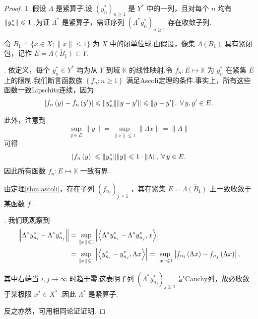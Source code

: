 \begin{proof}
1. 假设 $\Lambda$ 是紧算子.设 ${\left( {y}_{n}^{ * }\right) }_{n \geq  1}$ 是 ${Y}^{ * }$ 中的一列，且对每个 $n$ 均有 $\norm{{y}_{n}^{ * }} \leqslant  1$ .为证 ${\Lambda }^{ * }$ 是紧算子，需证序列 ${\left( {\Lambda }^{ * }{y}_{n}^{ * }\right) }_{n \geq  1}$ 存在收敛子列.

令 ${B}_{1} \doteq  \{ x \in  X;\| x\|  \leq  1\}$ 为 $X$ 中的闭单位球.由假设，像集 $\Lambda \left( {B}_{1}\right)$ 具有紧闭包，记作 $E \doteq  \overline{\Lambda \left( {B}_{1}\right) } \subset  Y.$

. 依定义，每个 ${y}_{n}^{ * } \in  {Y}^{ * }$ 均为从 $Y$ 到域 $\mathbb{K}$ 的线性映射.令 ${f}_{n} : E \mapsto  \mathbb{K}$ 为 ${y}_{n}^{ * }$ 在紧集 $E$ 上的限制.我们断言函数族 $\left\{  {{f}_{n};n \geq  1}\right\}$ 满足Ascoli定理的条件.事实上，所有这些函数一致Lipschitz连续，因为
\[
\left| {{f}_{n}\left( y\right)  - {f}_{n}\left( {y}^{\prime }\right) }\right|  \leqslant  \norm{{y}_{n}^{ * }}\norm{y - {y}^{\prime }} \leqslant  \norm{y - {y}^{\prime }},\;\forall\,y,{y}^{\prime } \in  E.
\]

此外，注意到
\[
\mathop{\sup }\limits_{{y \in  E}}\| y\|  = \mathop{\sup }\limits_{{\| x\|  \leq  1}}\| {\Lambda x}\|  = \| \Lambda \|
\]
可得
\[
\left| {{f}_{n}\left( y\right) }\right|  \leqslant  \norm{{y}_{n}^{ * }}\| y\|  \leqslant  1 \cdot  \| \Lambda \| ,\;\forall\,y \in  E.
\]
因此所有函数 ${f}_{n} : E \mapsto  \mathbb{K}$ 一致有界.

由定理\ref{thm:ascoli}，存在子列 ${\left( {f}_{{n}_{j}}\right) }_{j \geq  1}$ ，其在紧集 $E = \overline{\Lambda \left( {B}_{1}\right) }$ 上一致收敛于某函数 $f$ .

. 我们现观察到
{\begin{align*}
    \norm{{\Lambda }^{ * }{y}_{{n}_{i}}^{ * } - {\Lambda }^{ * }{y}_{{n}_{j}}^{ * }} &= \mathop{\sup }\limits_{{\| x\|  \leqslant  1}}\left| \left\langle  {{\Lambda }^{ * }{y}_{{n}_{i}}^{ * } - {\Lambda }^{ * }{y}_{{n}_{j}}^{ * },x}\right\rangle  \right|\\
    &= \mathop{\sup }\limits_{{\| x\|  \leqslant  1}}\left| \left\langle  {{y}_{{n}_{i}}^{ * } - {y}_{{n}_{j}}^{ * },{\Lambda x}}\right\rangle  \right|  = \mathop{\sup }\limits_{{\| x\|  \leqslant  1}}\left| {{f}_{{n}_{i}}\left( {\Lambda x}\right)  - {f}_{{n}_{j}}\left( {\Lambda x}\right) }\right| ,
\end{align*}}

其中右端当 $i,j \rightarrow  \infty$ 时趋于零.这表明子列 ${\left( {\Lambda }^{ * }{y}_{{n}_{j}}^{ * }\right) }_{j \geq  1}$ 是Cauchy列，故必收敛于某极限 ${x}^{ * } \in  {X}^{ * }$ .因此 ${\Lambda }^{ * }$ 是紧算子.

反之亦然，可用相同论证证明.
\end{proof}

